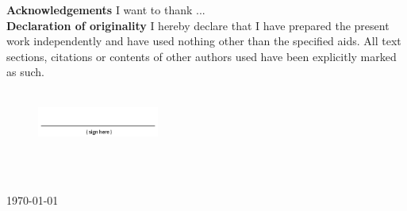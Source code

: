 
\vspace*{\fill}


\noindent\textbf{Acknowledgements} I want to thank ... \\


\noindent\textbf{Declaration of originality} I hereby declare that I have prepared the present work independently and have used nothing other than the specified aids. All text sections, citations or contents of other authors used have been explicitly marked as such.\\

\,

\begin{figure}[H]
    \centering
    \includegraphics[width=4cm]{img/sign.png}
\end{figure}

\,

\begin{center}
\city\\
\today\\
\authorname
\end{center}
